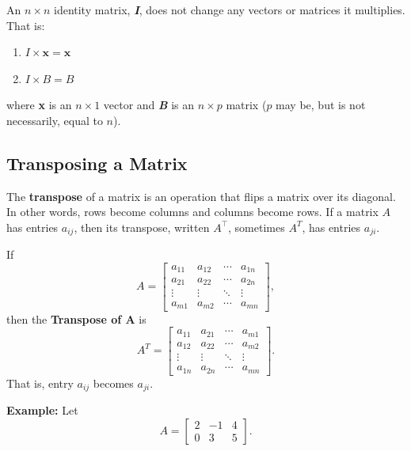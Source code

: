 \begin{mdframed}[style = important, frametitle = {Properties of the Identity Matrix}]
An $n \times n$ identity matrix, \textbf{\textit{I}}, does not change any
vectors or matrices it multiplies. That is:
\begin{enumerate}
\item $\mathbf{\mathit{I}} \times \mathbf{x} = \mathbf{x}$
\item $\mathbf{\mathit{I}} \times \mathbf{\mathit{B}} = \mathbf{\mathit{B}}$
\end{enumerate}
where \textbf{x} is an $n \times 1$ vector and \textbf{\textit{B}} is an $n
\times p$ matrix ($p$ may be, but is not necessarily, equal to $n$).
\end{mdframed}


\subsection{Transposing a Matrix}

The \textbf{transpose} of a matrix is an operation that flips a matrix over its diagonal. In other words, rows become columns and columns become rows. If a matrix $A$ has entries $a_{ij}$, then its transpose, written $A^\top$, sometimes $A^T$, has entries $a_{ji}$.

\begin{mdframed}[style = important, frametitle = {Transpose of a Matrix}]
If
\[
A =
\begin{bmatrix}
a_{11} & a_{12} & \cdots & a_{1n} \\
a_{21} & a_{22} & \cdots & a_{2n} \\
\vdots & \vdots & \ddots & \vdots \\
a_{m1} & a_{m2} & \cdots & a_{mn}
\end{bmatrix},
\]
then the \textbf{Transpose of A} is
\[
A^T =
\begin{bmatrix}
a_{11} & a_{21} & \cdots & a_{m1} \\
a_{12} & a_{22} & \cdots & a_{m2} \\
\vdots & \vdots & \ddots & \vdots \\
a_{1n} & a_{2n} & \cdots & a_{mn}
\end{bmatrix}.
\]
That is, entry $a_{ij}$ becomes $a_{ji}$.
\end{mdframed}

\textbf{Example:}
Let
\[
A =
\begin{bmatrix}
2 & -1 & 4 \\
0 & 3 & 5
\end{bmatrix}.
\]

